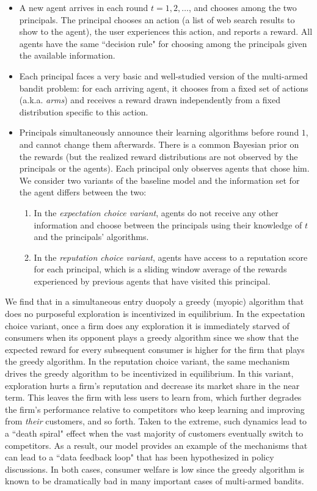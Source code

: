 \begin{itemize}

\item A new agent arrives in each round $t=1,2, \ldots$, and chooses among the two principals. The principal chooses an action (\eg a list of web search results to show to the agent), the user experiences this action, and reports a reward. All agents have the same ``decision rule" for choosing among the principals given the available information.

\item Each principal faces a very basic and well-studied version of the multi-armed bandit problem: for each arriving agent, it chooses from a fixed set of actions  (a.k.a. \emph{arms}) and receives a reward drawn independently from a fixed distribution specific to this action.

\item Principals simultaneously announce their learning algorithms before round $1$, and cannot change them afterwards. There is a common Bayesian prior on the rewards (but the realized reward distributions are not observed by the principals or the agents).  Each principal only observes agents that chose him. We consider two variants of the baseline model and the information set for the agent differs between the two:
\begin{enumerate}
\item In the \textit{expectation choice variant}, agents do not receive any other information and choose between the principals using their knowledge of $t$ and the principals' algorithms.
\item In the \textit{reputation choice variant}, agents have access to a reputation score for each principal, which is a sliding window average of the rewards experienced by previous agents that have visited this principal.
\end{enumerate}
\end{itemize}

We find that in a simultaneous entry duopoly a greedy (myopic) algorithm that does no purposeful exploration is incentivized in equilibrium. In the expectation choice variant, once a firm does any exploration it is immediately starved of consumers when its opponent plays a greedy algorithm since we show that the expected reward for every subsequent consumer is higher for the firm that plays the greedy algorithm. In the reputation choice variant, the same mechanism drives the greedy algorithm to be incentivized in equilibrium. In this variant, exploration hurts a firm's reputation and decrease its market share in the near term. This leaves the firm with less users to learn from, which further degrades the firm's performance relative to competitors who keep learning and improving from \emph{their} customers, and so forth. Taken to the extreme, such dynamics lead to a ``death spiral" effect when the vast majority of customers eventually switch to competitors. As a result, our model provides an example of the mechanisms that can lead to a ``data feedback loop" that has been hypothesized in policy discussions. In both cases, consumer welfare is low since the greedy algorithm is known to be dramatically bad in many important cases of multi-armed bandits.

